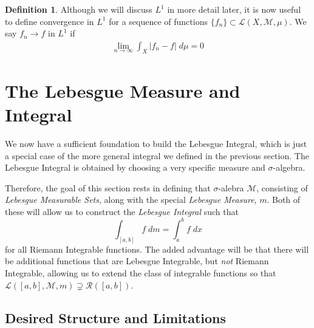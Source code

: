 \documentclass[12pt]{article}
\theoremstyle{plain}
\theoremstyle{definition}
\newtheorem{defn}[thm]{Definition}
\theoremstyle{remark}
\begin{document}
\begin{defn}
    Although we will discuss $L^1$ in more detail later, it is now useful to define convergence in $L^1$ for a sequence of functions $\{f_n\}\subset\mathscr{L}(X,\mathscr{M},\mu)$. We say $f_n \rightarrow f$ in $L^1$ if 
\begin{align*}
    \lim_{n\rightarrow\infty} \int_X |f_n-f| \; d\mu
    = 0
\end{align*}
\end{defn}




\newpage
\section{The Lebesgue Measure and Integral}

We now have a sufficient foundation to build the Lebesgue Integral, which is just a special case of the more general integral we defined in the previous section. The Lebesgue Integral is obtained by choosing a very specific measure and $\sigma$-algebra.

Therefore, the goal of this section rests in defining that $\sigma$-alebra $\mathscr{M}$, consisting of \emph{Lebesgue Measurable Sets}, along with the special \emph{Lebesgue Measure}, $m$. Both of these will allow us to construct the \emph{Lebesgue Integral} such that
\[
    \int_{[a,b]} f \; dm = \int_a^b f \; dx
\]
for all Riemann Integrable functions. The added advantage will be that there will be additional functions that are Lebesgue Integrable, but \emph{not} Riemann Integrable, allowing us to extend the class of integrable functions so that $\mathscr{L}([a,b],\mathscr{M},m) \supsetneq \mathscr{R}([a,b])$. 



\subsection{Desired Structure and Limitations}
\end{document}
